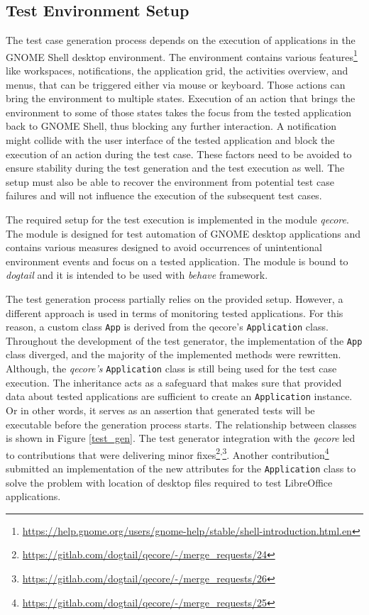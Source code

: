 \subsection{Test Environment Setup}
The test case generation process depends on the execution of applications in the GNOME Shell desktop environment. The environment contains various features\footnote{\url{https://help.gnome.org/users/gnome-help/stable/shell-introduction.html.en}} like workspaces, notifications, the application grid, the activities overview, and menus, that can be triggered either via mouse or keyboard. Those actions can bring the environment to multiple states. Execution of an action that brings the environment to some of those states takes the focus from the tested application back to GNOME Shell, thus blocking any further interaction. A notification might collide with the user interface of the tested application and block the execution of an action during the test case. These factors need to be avoided to ensure stability during the test generation and the test execution as well. The setup must also be able to recover the environment from potential test case failures and will not influence the execution of the subsequent test cases. 

The required setup for the test execution is implemented in the module \textit{qecore}. The module is designed for test automation of GNOME desktop applications and contains various measures designed to avoid occurrences of unintentional environment events and focus on a tested application. The module is bound to \textit{dogtail} and it is intended to be used with \textit{behave} framework.\cite{qecore} 

The test generation process partially relies on the provided setup. However, a different approach is used in terms of monitoring tested applications. For this reason, a custom class \texttt{App} is derived from the qecore's \texttt{Application} class. Throughout the development of the test generator, the implementation of the \texttt{App} class diverged, and the majority of the implemented methods were rewritten. Although, the \textit{qecore's} \texttt{Application} class is still being used for the test case execution. The inheritance acts as a safeguard that makes sure that provided data about tested applications are sufficient to create an \texttt{Application} instance. Or in other words, it serves as an assertion that generated tests will be executable before the generation process starts. The relationship between classes is shown in Figure \ref{test_gen}. The test generator integration with the \textit{qecore} led to contributions that were delivering minor fixes\footnote{\url{https://gitlab.com/dogtail/qecore/-/merge_requests/24}}\textsuperscript{,}\footnote{\url{https://gitlab.com/dogtail/qecore/-/merge_requests/26}}. Another contribution\footnote{\url{https://gitlab.com/dogtail/qecore/-/merge_requests/25}} submitted an implementation of the new attributes for the \texttt{Application} class to solve the problem with location of desktop files required to test LibreOffice applications.

